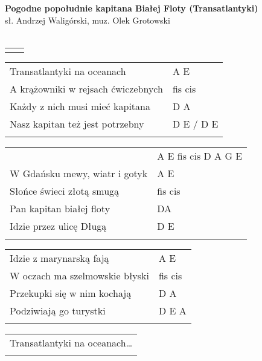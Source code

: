 \documentclass[a5paper]{article}
\begin{document}


\noindent
\fontsize{12pt}{15pt}\selectfont
\textbf{Pogodne popołudnie kapitana Białej Floty (Transatlantyki)} \\
\fontsize{8pt}{10pt}\selectfont
sł. Andrzej Waligórski, muz. Olek Grotowski \\ \\
\fontsize{10pt}{12pt}\selectfont
{}
\begin{tabular}{@{}p{6.50cm}p{3cm}@{}}
\noindent
\end{tabular}

\noindent
\begin{tabular}{@{}p{6.00cm}p{4cm}@{}}
Transatlantyki na oceanach & A E \\
A krążowniki w rejsach ćwiczebnych & fis cis \\
Każdy z nich musi mieć kapitana & D A \\
Nasz kapitan też jest potrzebny & D E / D E \\ \\
\end{tabular}

\noindent
\begin{tabular}{@{}p{7.00cm}p{4cm}@{}}
&A E fis cis D A G E \\
W Gdańsku mewy, wiatr i gotyk & A E \\
Słońce świeci złotą smugą & fis cis \\
Pan kapitan białej floty & DA \\
Idzie przez ulicę Długą & D E \\ \\
\end{tabular}
 
\noindent
\begin{tabular}{@{}p{7.00cm}p{3cm}@{}}
Idzie z marynarską fają & A E \\
W oczach ma szelmowskie błyski & fis cis \\
Przekupki się w nim kochają & D A \\
Podziwiają go turystki & D E A \\ \\
\end{tabular}

\noindent
\begin{tabular}{@{}p{7.50cm}@{}} 
Transatlantyki na oceanach… \\ \\
\end{tabular}
\end{document}
